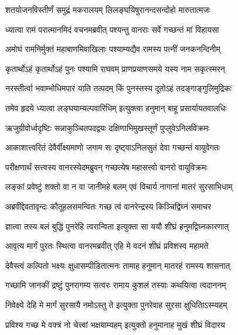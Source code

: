 





\twolineshloka
{शतयोजनविस्तीर्णं समुद्रं मकरालयम्}
{लिलङ्घयिषुरानन्दसन्दोहो मारुतात्मजः} %

\twolineshloka
{ध्यात्वा रामं परात्मानमिदं वचनमब्रवीत्}
{पश्यन्तु वानराः सर्वे गच्छन्तं मां विहायसा} %

\twolineshloka
{अमोघं रामनिर्मुक्तं महाबाणमिवाखिलाः}
{पश्याम्यद्यैव रामस्य पत्नीं जनकनन्दिनीम्} %

\twolineshloka
{कृतार्थोऽहं कृतार्थोऽहं पुनः पश्यामि राघवम्}
{प्राणप्रयाणसमये यस्य नाम सकृत्स्मरन्} %

\twolineshloka
{नरस्तीर्त्वा भवाम्भोधिमपारं याति तत्पदम्}
{किं पुनस्तस्य दूतोऽहं तदङ्गाङ्गुलिमुद्रिकः} %

\twolineshloka
{तमेव हृदये ध्यात्वा लङ्घयाम्यल्पवारिधिम्}
{इत्युक्त्वा हनुमान् बाहू प्रसार्यायतवालधिः} %

\twolineshloka
{ऋजुग्रीवोर्ध्वदृष्टिः सन्नाकुञ्चितपदद्वयः}
{दक्षिणाभिमुखस्तूर्णं पुप्लुवेऽनिलविक्रमः} %

\twolineshloka
{आकाशात्त्वरितं देवैर्वीक्ष्यमाणो जगाम सः}
{दृष्ट्वाऽनिलसुतं देवा गच्छन्तं वायुवेगतः} %

\twolineshloka
{परीक्षणार्थं सत्त्वस्य वानरस्येदमब्रुवन्}
{गच्छत्येष महासत्त्वो वानरो वायुविक्रमः} %

\twolineshloka
{लङ्कां प्रवेष्टुं शक्तो वा न वा जानीमहे बलम्}
{एवं विचार्य नागानां मातरं सुरसाभिधाम्} %

\twolineshloka
{अब्रवीद्देवतावृन्दः कौतूहलसमन्वितः}
{गच्छ त्वं वानरेन्द्रस्य किञ्चिद्विघ्नं समाचर} %

\twolineshloka
{ज्ञात्वा तस्य बलं बुद्धिं पुनरेहि त्वरान्विता}
{इत्युक्ता सा ययौ शीघ्रं हनुमद्विघ्नकारणात्} %

\twolineshloka
{आवृत्य मार्गं पुरतः स्थित्वा वानरमब्रवीत्}
{एहि मे वदनं शीघ्रं प्रविशस्व महामते} %

\twolineshloka
{देवैस्त्वं कल्पितो भक्ष्यः क्षुधासम्पीडितात्मनः}
{तामाह हनुमान् मातरहं रामस्य शासनात्} %

\twolineshloka
{गच्छामि जानकीं द्रष्टुं पुनरागम्य सत्वरः}
{रामाय कुशलं तस्याः कथयित्वा त्वदाननम्} %

\twolineshloka
{निवेक्ष्ये देहि मे मार्गं सुरसायै नमोऽस्तु ते}
{इत्युक्ता पुनरेवाह सुरसा क्षुधितािऽस्म्यहम्} %

\twolineshloka
{प्रविश्य गच्छ मे वक्त्रं नो चेत्त्वां भक्षयाम्यहम्}
{इत्युक्तो हनुमानाह मुखं शीघ्रं विदारय} %

